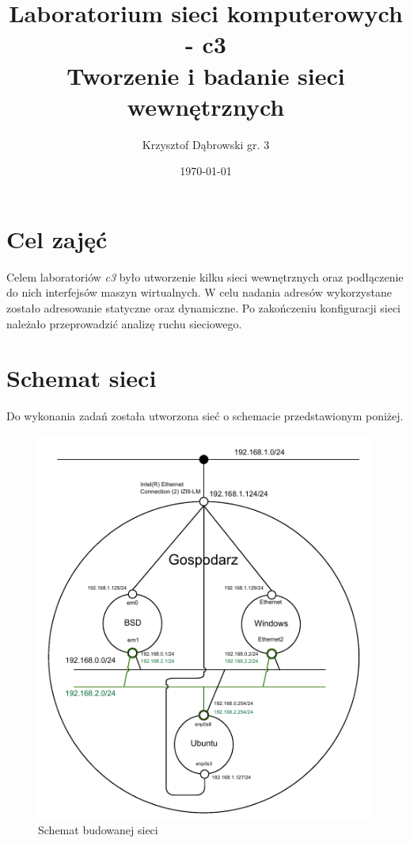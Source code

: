 \documentclass{mwart} %
\title{Laboratorium sieci komputerowych - c3 \\ Tworzenie i badanie sieci wewnętrznych}
\author{Krzysztof Dąbrowski gr. 3}
\date{\today}
\begin{document}
\maketitle{}
\tableofcontents{}

\section{Cel zajęć}
Celem laboratoriów \textit{c3} było utworzenie kilku sieci wewnętrznych oraz podłączenie do nich interfejsów maszyn wirtualnych. W celu nadania adresów wykorzystane zostało adresowanie statyczne oraz dynamiczne. Po zakończeniu konfiguracji sieci należało przeprowadzić analizę ruchu sieciowego.

\section{Schemat sieci}
Do wykonania zadań została utworzona sieć o schemacie przedstawionym poniżej.
\nopagebreak{}
\begin{figure}[H]
  \centering
  \includegraphics[width=\textwidth]{Projekt_Sieci}
  
  \caption{Schemat budowanej sieci}
  \label{fig:SchematSieci}
\end{figure}
\end{document}
